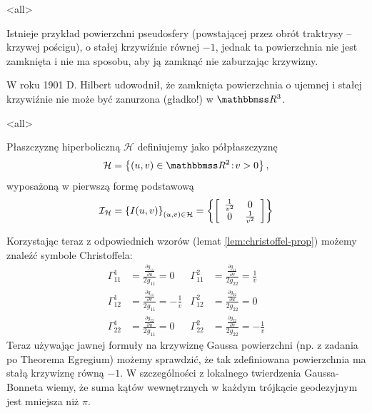 \mode*
\mode<all>{}

\begin{frame}
Istnieje przykład powierzchni pseudosfery (powstającej przez obrót traktrysy -- krzywej pościgu), o stałej krzywiźnie równej $-1$, jednak ta powierzchnia nie jest zamknięta i nie ma sposobu, aby ją zamknąć nie zaburzając krzywizny.
\pause\begin{center}

\end{center}

\pause W roku 1901 D. Hilbert udowodnił, że zamknięta powierzchnia o ujemnej i stałej krzywiźnie nie może być zanurzona (gładko!) w $\R^3$. 

\end{frame}
\mode<all>{}

\begin{frame}

\begin{definicja}
Płaszczyznę hiperboliczną $\mathcal{H}$ definiujemy jako półpłaszczyznę 
\[\mathcal{H}=\le\{(u,v)\in \R^2\colon v>0 \ri\},\] wyposażoną w pierwszą formę podstawową
\[\mathcal{I}_{\mathcal{H}}=\left\{I(u,v)\right\}_{(u,v)\in \mathcal{H}}=\left\{\left[
\begin{array}{cc}
\frac{1}{v^2}&0\\
0 & \frac{1}{v^2}
\end{array}
\right]\right\}
\]
\end{definicja}

\end{frame}

\begin{frame}[<+->]
Korzystając teraz z odpowiednich wzorów (lemat \ref{lem:christoffel-prop}) możemy znaleźć symbole Christoffela:
\begin{align*}
\Gamma^1_{11}&=\frac{\frac{\partial g_{11}}{\partial u}}{2g_{11}}=0 &
\Gamma^2_{11}&=\frac{\frac{\partial g_{11}}{\partial v}}{2g_{22}}=\frac{1}{v}\\
\Gamma^1_{12}&=\frac{\frac{\partial g_{11}}{\partial v}}{2g_{11}}=-\frac{1}{v} &
\Gamma^2_{12}&=\frac{\frac{\partial g_{22}}{\partial u}}{2g_{22}}=0\\
\Gamma^1_{22}&=\frac{\frac{\partial g_{22}}{\partial u}}{2g_{11}}=0 &
\Gamma^2_{22}&=\frac{\frac{\partial g_{22}}{\partial v}}{2g_{22}}=-\frac{1}{v}
\end{align*}
\pause Teraz używając jawnej formuły na krzywiznę Gaussa powierzchni (np. z 
zadania po Theorema Egregium) możemy sprawdzić, że tak zdefiniowana powierzchnia 
ma stałą krzywiznę równą $-1$. \pause W szczególności z lokalnego twierdzenia 
Gaussa-Bonneta wiemy, że suma kątów wewnętrznych w każdym trójkącie geodezyjnym 
jest mniejsza niż $\pi$.
\end{frame}

